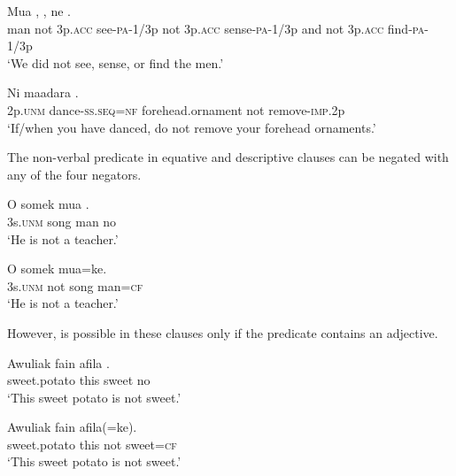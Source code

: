 \ea%
\label{ex:6:x1092}
\gll Mua      ,      , ne      .\\
man  not  3p.\textsc{acc}  see-\textsc{pa}-1/3p  not  3p.\textsc{acc}  sense-\textsc{pa}-1/3p and  not  3p.\textsc{acc}  find-\textsc{pa}-1/3p\\
\glt `We did not see, sense, or find the men.'
\z

\ea%
\label{ex:6:x1113}
\gll Ni   maadara    . \\
2p.\textsc{unm}  dance-\textsc{ss}.\textsc{seq}=\textsc{nf}  forehead.ornament  not  remove-\textsc{imp}.2p\\
\glt `If/when you have danced, do not remove your forehead ornaments.'
\z

The non-verbal predicate in equative and descriptive clauses can be negated with any of the four negators. 

\ea%
\label{ex:6:x1093}
\gll O  somek  mua  . \\
3s.\textsc{unm}  song  man  no\\
\glt `He is not a teacher.'
\z

\ea%
\label{ex:6:x1095}
\gll O    somek  mua=ke. \\
3s.\textsc{unm}  not  song  man=\textsc{cf}\\
\glt `He is not a teacher.' 
\z

However,  is possible in these clauses only if the predicate contains an adjective.

\ea%
\label{ex:6:x1096}
\gll Awuliak  fain  afila  . \\
sweet.potato  this  sweet  no\\
\glt `This sweet potato is not sweet.'
\z

\ea%
\label{ex:6:x1097}
\gll Awuliak  fain    afila(=ke). \\
sweet.potato  this  not  sweet=\textsc{cf}\\
\glt `This sweet potato is not sweet.'
\z

